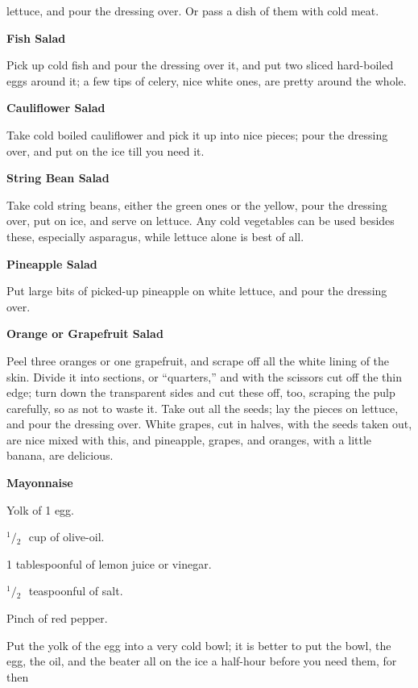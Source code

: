 \documentclass[11pt]{book}
\newcommand{\indpar}{\par\noindent\hspace*{\parindent}}
\newcommand{\ingredient}{\indpar}
\newcommand{\instruction}{\indpar}
\newcommand{\OneHalf}{\ensuremath{{}^1\!\!/\!{}_2\mbox{\ }}}
\newenvironment{RecipeTitle}{\medskip\begin{center}\large\bf }{\end{center}\smallskip}
\begin{document}
lettuce, and pour the dressing over.  Or pass a dish of
them with cold meat.
\begin{RecipeTitle}
Fish Salad\label{fish_salad}
\end{RecipeTitle}
\instruction
  Pick up cold fish and pour the dressing over it, and
put two sliced hard-boiled eggs around it; a few tips of
celery, nice white ones, are pretty around the whole.
\begin{RecipeTitle}
Cauliflower Salad\label{cauliflower_salad}
\end{RecipeTitle}
\instruction
  Take cold boiled cauliflower and pick it up into nice
pieces; pour the dressing over, and put on the ice till
you need it.\pagebreak[4]
\begin{RecipeTitle}
String Bean Salad\label{string_bean_salad}
\end{RecipeTitle}
\instruction
  Take cold string beans, either the green ones or the
yellow, pour the dressing over, put on ice, and serve on
lettuce.  Any cold vegetables can be used besides these,
especially asparagus, while lettuce alone is best of all.
\begin{RecipeTitle}
Pineapple Salad\label{pineapple_salad}
\end{RecipeTitle}
\instruction
  Put large bits of picked-up pineapple on white
lettuce, and pour the dressing over.
\begin{RecipeTitle}
Orange or Grapefruit Salad\label{orange_or_grapefruit_salad}
\end{RecipeTitle}
\instruction
  Peel three oranges or one grapefruit, and scrape off
all the white lining of the skin.  Divide it into sections,
or ``quarters,'' and with the scissors cut off the thin edge;
turn down the transparent sides and cut these off, too,
scraping the pulp carefully, so as not to waste it.
Take out all the seeds; lay the pieces on lettuce, and
pour the dressing over.  White grapes, cut in halves,
with the seeds taken out, are nice mixed with this, and
pineapple, grapes, and oranges, with a little banana,
are delicious.
\begin{RecipeTitle}
Mayonnaise\label{mayonnaise}
\end{RecipeTitle}
\ingredient  Yolk of 1 egg.
\ingredient  \OneHalf cup of olive-oil.
\ingredient  1 tablespoonful of lemon juice or vinegar.
\ingredient  \OneHalf teaspoonful of salt.
\ingredient  Pinch of red pepper.
\instruction
  Put the yolk of the egg into a very cold bowl; it is
better to put the bowl, the egg, the oil, and the beater
all on the ice a half-hour before you need them, for then
\end{document}
